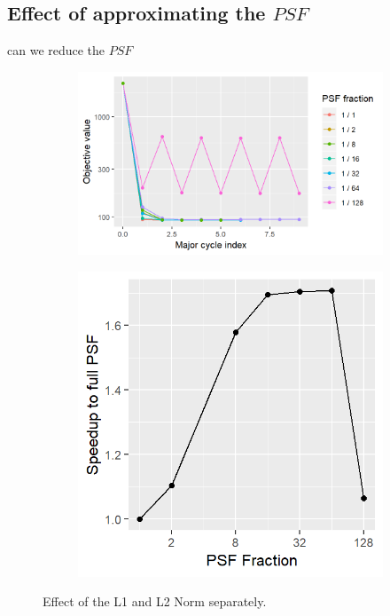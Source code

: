 \subsection{Effect of approximating the $PSF$} \label{results:gradients}
can we reduce the $PSF$

\begin{figure}[h]
	\centering
	\begin{subfigure}[b]{0.6\linewidth}
		\includegraphics[width=\linewidth]{./chapters/10.results/gradient/size.png}
	\end{subfigure}
	\begin{subfigure}[b]{0.36\linewidth}
		\includegraphics[width=\linewidth]{./chapters/10.results/gradient/speedup.png}
	\end{subfigure}
	
	\caption{Effect of the L1 and L2 Norm separately.}
	\label{results:gradients:size}
\end{figure}

